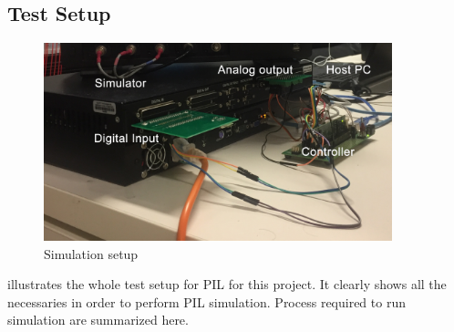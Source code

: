 \subsection{Test Setup}
\begin{figure}[h]
     \centering
     \includegraphics[width = 0.9\textwidth]{figures/setup}
     \caption{Simulation setup}
     \label{fig:setup}
\end{figure}
 illustrates the whole test setup for \gls{PIL} for this project. It clearly shows all the necessaries in order to perform \gls{PIL} simulation. Process required to run simulation are summarized here. 
